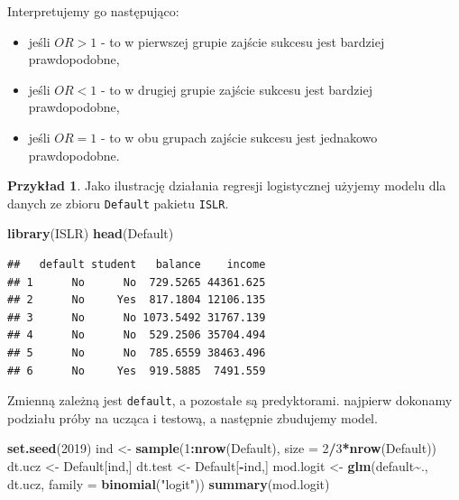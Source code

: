 \documentclass[
]{book}
\newenvironment{Shaded}{\begin{snugshade}}{\end{snugshade}}
\newcommand{\AttributeTok}[1]{\textcolor[rgb]{0.13,0.29,0.53}{#1}}
\newcommand{\DecValTok}[1]{\textcolor[rgb]{0.00,0.00,0.81}{#1}}
\newcommand{\FunctionTok}[1]{\textcolor[rgb]{0.13,0.29,0.53}{\textbf{#1}}}
\newcommand{\NormalTok}[1]{#1}
\newcommand{\OtherTok}[1]{\textcolor[rgb]{0.56,0.35,0.01}{#1}}
\newcommand{\SpecialCharTok}[1]{\textcolor[rgb]{0.81,0.36,0.00}{\textbf{#1}}}
\newcommand{\StringTok}[1]{\textcolor[rgb]{0.31,0.60,0.02}{#1}}
\providecommand{\tightlist}{%
  \setlength{\itemsep}{0pt}\setlength{\parskip}{0pt}}
\theoremstyle{plain}
\theoremstyle{definition}
\theoremstyle{definition}
\theoremstyle{definition}
\newtheorem{example}{Przykład}[chapter]
\theoremstyle{definition}
\theoremstyle{definition}
\theoremstyle{remark}
\begin{document}
Interpretujemy go następująco:

\begin{itemize}
\tightlist
\item
  jeśli \(OR>1\) - to w pierwszej grupie zajście sukcesu jest bardziej prawdopodobne,
\item
  jeśli \(OR<1\) - to w drugiej grupie zajście sukcesu jest bardziej prawdopodobne,
\item
  jeśli \(OR=1\) - to w obu grupach zajście sukcesu jest jednakowo prawdopodobne.
\end{itemize}

\begin{example}
\protect\hypertarget{exm:logit}{}\label{exm:logit}Jako ilustrację działania regresji logistycznej użyjemy modelu dla danych ze zbioru \texttt{Default} pakietu \texttt{ISLR}.
\end{example}

\begin{Shaded}
\begin{Highlighting}[]
\FunctionTok{library}\NormalTok{(ISLR)}
\FunctionTok{head}\NormalTok{(Default)}
\end{Highlighting}
\end{Shaded}

\begin{verbatim}
##   default student   balance    income
## 1      No      No  729.5265 44361.625
## 2      No     Yes  817.1804 12106.135
## 3      No      No 1073.5492 31767.139
## 4      No      No  529.2506 35704.494
## 5      No      No  785.6559 38463.496
## 6      No     Yes  919.5885  7491.559
\end{verbatim}

Zmienną zależną jest \texttt{default}, a pozostałe są predyktorami. najpierw dokonamy podziału próby na ucząca i testową, a następnie zbudujemy model.

\begin{Shaded}
\begin{Highlighting}[]
\FunctionTok{set.seed}\NormalTok{(}\DecValTok{2019}\NormalTok{)}
\NormalTok{ind }\OtherTok{\textless{}{-}} \FunctionTok{sample}\NormalTok{(}\DecValTok{1}\SpecialCharTok{:}\FunctionTok{nrow}\NormalTok{(Default), }\AttributeTok{size =} \DecValTok{2}\SpecialCharTok{/}\DecValTok{3}\SpecialCharTok{*}\FunctionTok{nrow}\NormalTok{(Default))}
\NormalTok{dt.ucz }\OtherTok{\textless{}{-}}\NormalTok{ Default[ind,]}
\NormalTok{dt.test }\OtherTok{\textless{}{-}}\NormalTok{ Default[}\SpecialCharTok{{-}}\NormalTok{ind,]}
\NormalTok{mod.logit }\OtherTok{\textless{}{-}} \FunctionTok{glm}\NormalTok{(default}\SpecialCharTok{\textasciitilde{}}\NormalTok{., dt.ucz, }\AttributeTok{family =} \FunctionTok{binomial}\NormalTok{(}\StringTok{"logit"}\NormalTok{))}
\FunctionTok{summary}\NormalTok{(mod.logit)}
\end{Highlighting}
\end{Shaded}
\end{document}
